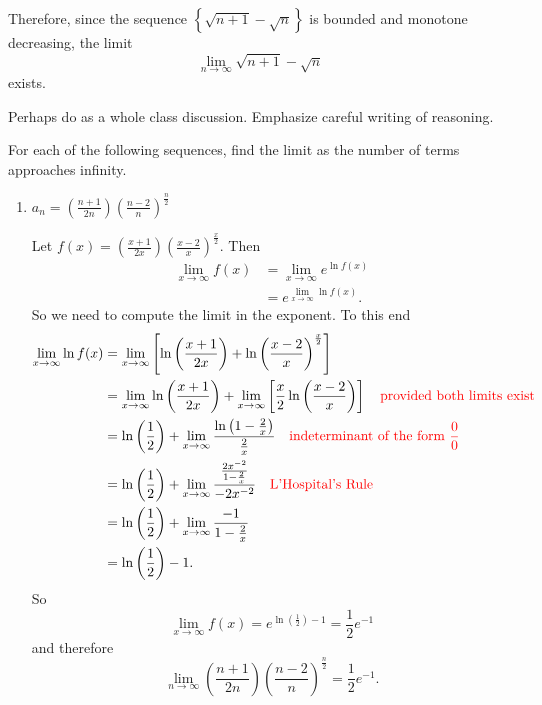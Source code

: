 \documentclass[noinstructornotes]{ximera}
\begin{document}
\begin{problem}
\begin{enumerate}
\begin{problem}
\begin{freeResponse}
	Therefore, since the sequence $\left\{ \sqrt{n+1} - \sqrt{n} \right\}$ is bounded and monotone decreasing, the limit
		\[
		\lim_{n \to \infty} \sqrt{n+1} - \sqrt{n}
		\]
	exists.
	\end{freeResponse}
		
\end{problem}

\begin{instructorNotes}
Perhaps do as a whole class discussion.  
Emphasize careful writing of reasoning.
\end{instructorNotes}




\begin{problem}
For each of the following sequences, find the limit as the number of terms approaches infinity.
	\begin{enumerate}
>>>>>>> origin/master
	
	\item  $a_n = \left( \frac{n+1}{2n} \right) \left( \frac{n-2}{n} \right)^{\frac{n}{2}}$
	\begin{freeResponse}
	Let $f(x) =  \left( \frac{x+1}{2x} \right) \left( \frac{x-2}{x} \right)^{\frac{x}{2}}$.  
	Then
		\begin{align*}
		\lim_{x \to \infty} f(x) 
		&= \lim_{x \to \infty} e^{\ln f(x)}  \\
		&= e^{\lim_{x \to \infty} \ln f(x)}.
		\end{align*}
	So we need to compute the limit in the exponent.  To this end
		\begin{align*}
		\lim_{x \to \infty} \ln f(x) 
		&= \lim_{x \to \infty} \left[ \ln \left( \frac{x+1}{2x} \right) + \ln \left( \frac{x-2}{x} \right)^{\frac{x}{2}} \right]  \\
		&= \lim_{x \to \infty} \ln \left( \frac{x+1}{2x} \right) + \lim_{x \to \infty} \left[ \frac{x}{2} \ln \left( \frac{x-2}{x} \right) \right]  \quad {\color{red}\text{provided both limits exist}}  \\
		&= \ln \left( \frac{1}{2} \right) + \lim_{x \to \infty} \frac{\ln \left( 1 - \frac{2}{x} \right)}{\frac{2}{x}}  \quad {\color{red}\text{indeterminant of the form }\frac{0}{0}}\\
		&= \ln \left( \frac{1}{2} \right) + \lim_{x \to \infty} \frac{\frac{2x^{-2}}{1-\frac{2}{x}}}{-2x^{-2}}  \quad {\color{red}\text{L'Hospital's Rule}}  \\
		&= \ln \left( \frac{1}{2} \right) + \lim_{x \to \infty} \frac{-1}{1-\frac{2}{x}}  \\
		&= \ln \left( \frac{1}{2} \right) - 1.
		\end{align*}
	So 
		\[
		\lim_{x \to \infty} f(x) = e^{\ln \left( \frac{1}{2} \right) - 1} = \frac{1}{2} e^{-1}
		\]
	and therefore
		\[
		\lim_{n \to \infty} \left( \frac{n+1}{2n} \right) \left( \frac{n-2}{n} \right)^{\frac{n}{2}} = \frac{1}{2} e^{-1}.
		\]
	\end{freeResponse}
	

\end{enumerate}
\end{problem}
\end{enumerate}
\end{problem}
\end{document}
